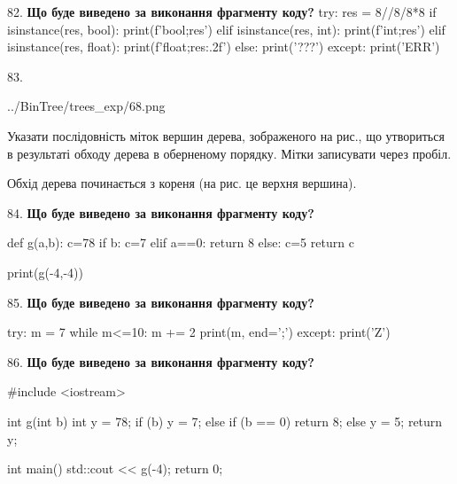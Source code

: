 \documentclass[11pt]{article}
\begin{document}
82. \textbf{Що буде виведено за виконання фрагменту коду?}
try:
    res = 8//8/8*8
    if isinstance(res, bool):
        print(f'bool;{res}')
    elif isinstance(res, int):
        print(f'int;{res}')
    elif isinstance(res, float):
        print(f'float;{res:.2f}')
    else:
        print('???')
except:
    print('ERR')
\par\vspace{5mm}

83. 

\begin{center}
	{../BinTree/trees_exp/68.png}
\end{center}
Указати послідовність міток вершин дерева, зображеного на рис., що утвориться в результаті обходу дерева в оберненому порядку. Мітки записувати через пробіл.\par Обхід дерева починається з кореня (на рис. це верхня вершина).
\par\vspace{5mm}

84. \textbf{Що буде виведено за виконання фрагменту коду?}

def g(a,b):
    c=78
    if b:
        c=7
    elif a==0:
         return 8
    else: 
        c=5
    return c

print(g(-4,-4))\par\vspace{5mm}

85. \textbf{Що буде виведено за виконання фрагменту коду?}

try:
    m = 7
    while m<=10:
        m += 2
    print(m, end=';')
except:
    print('Z')

\par\vspace{5mm}

86. \textbf{Що буде виведено за виконання фрагменту коду?}

#include <iostream>

int g(int b){
    int y = 78;
    if (b) 
        y = 7;
    else if (b == 0)
         return 8;
    else
         y = 5;
    return y;
}

int main(){
    std::cout << g(-4);
    return 0;
}

\par\vspace{5mm}
\end{document}
